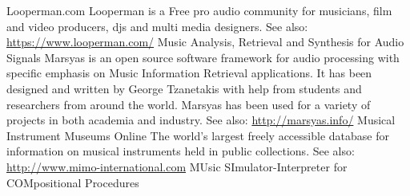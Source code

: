 	{Looperman.com}
	{Looperman is a Free pro audio community for musicians, film and video producers, djs and multi media designers. See also: \url{https://www.looperman.com/}}
	{Music Analysis, Retrieval and Synthesis for Audio Signals}
	{Marsyas is an open source software framework for audio processing with specific emphasis on Music Information Retrieval applications. It has been designed and written by George Tzanetakis with help from students and researchers from around the world. Marsyas has been used for a variety of projects in both academia and industry. See also: \url{http://marsyas.info/}}
	{Musical Instrument Museums Online}
	{The world's largest freely accessible database for information on musical instruments held in public collections. See also: \url{http://www.mimo-international.com}}
	{MUsic SImulator-Interpreter for COMpositional Procedures}
